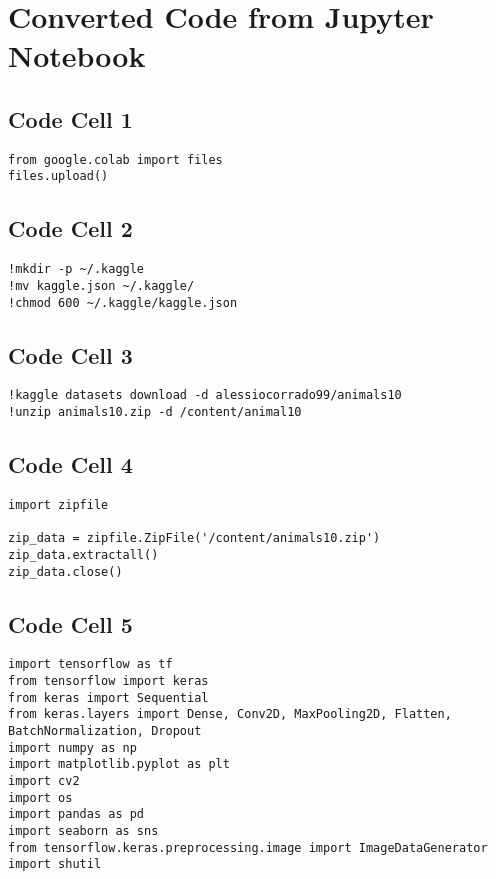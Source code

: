 \documentclass{article}
\begin{document}
\section*{Converted Code from Jupyter Notebook}

\subsection*{Code Cell 1}
\begin{lstlisting}
from google.colab import files
files.upload()
\end{lstlisting}

\subsection*{Code Cell 2}
\begin{lstlisting}
!mkdir -p ~/.kaggle
!mv kaggle.json ~/.kaggle/
!chmod 600 ~/.kaggle/kaggle.json
\end{lstlisting}

\subsection*{Code Cell 3}
\begin{lstlisting}
!kaggle datasets download -d alessiocorrado99/animals10
!unzip animals10.zip -d /content/animal10
\end{lstlisting}

\subsection*{Code Cell 4}
\begin{lstlisting}
import zipfile

zip_data = zipfile.ZipFile('/content/animals10.zip')
zip_data.extractall()
zip_data.close()
\end{lstlisting}

\subsection*{Code Cell 5}
\begin{lstlisting}
import tensorflow as tf
from tensorflow import keras
from keras import Sequential
from keras.layers import Dense, Conv2D, MaxPooling2D, Flatten, BatchNormalization, Dropout
import numpy as np
import matplotlib.pyplot as plt
import cv2
import os
import pandas as pd
import seaborn as sns
from tensorflow.keras.preprocessing.image import ImageDataGenerator
import shutil
\end{lstlisting}
\end{document}

